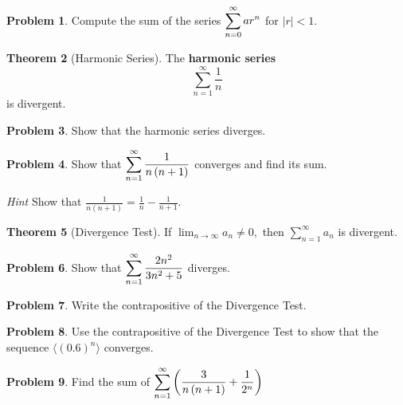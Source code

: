 \documentclass[letterpaper, twoside, 12pt]{book}
\theoremstyle{definition}
\newtheorem{theorem}{Theorem}
\theoremstyle{definition}
\newtheorem{problem}[theorem]{Problem}
\newcommand{\ds}{\ensuremath{\displaystyle}}
\begin{document}
\begin{problem}
  Compute the sum of the series $\ds \sum_{n = 0}^{\infty} ar^n$ for
  $\left|r\right| < 1$.
\end{problem}

\vfill

\newpage

\begin{theorem}[Harmonic Series]
 The \textbf{harmonic series} $$\sum_{n = 1}^{\infty} \frac{1}{n}$$ is divergent.
\end{theorem}

\begin{problem}
 Show that the harmonic series diverges.
\end{problem}

\vfill

\begin{problem}
 Show that $\ds \sum_{n = 1}^{\infty} \frac{1}{n\left(n+1\right)}$ converges
 and find its sum.
\end{problem}
\noindent \emph{Hint} Show that
$\frac{1}{n\left(n+1\right)}=\frac{1}{n}-\frac{1}{n+1}$.

\vfill

\newpage

\begin{theorem}[Divergence Test]
 If $\lim_{n \rightarrow \infty} a_n \neq 0,$ then $\sum_{n = 1}^{\infty} a_n$ is divergent.
\end{theorem}

\begin{problem}
 Show that $\ds \sum_{n = 1}^{\infty} \frac{2n^2}{3n^2+5}$ diverges.
\end{problem}

\vfill

\begin{problem}
 Write the contrapositive of the Divergence Test.
\end{problem}

\vfill

\begin{problem}
Use the contrapositive of the Divergence Test to show that the sequence
$\langle(0.6)^n\rangle$ converges.
\end{problem}

\vfill

\begin{problem}
 Find the sum of $\ds \sum_{n = 1}^{\infty} \left( \frac{3}{n\left(n+1\right)} + \frac{1}{2^n} \right)$
\end{problem}
\end{document}
